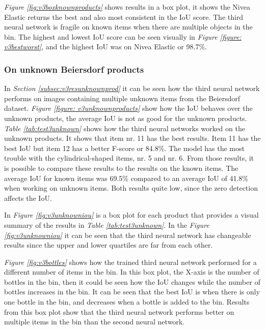 \textit{Figure \ref{fig:v3boxknownproducts}} shows results in a box plot, it shows the Nivea Elastic returns the best and also most consistent in the IoU score. The third neural network is fragile on known items when there are multiple objects in the bin. The highest and lowest IoU score can be seen visually in \textit{Figure \ref{figure: v3bestworst}}, and the highest IoU was on Nivea Elastic or 98.7\%. 

\subsubsection{On unknown Beiersdorf products}
In \textit{Section \ref{subsec:v3resunknownprod}} it can be seen how the third neural network performs on images containing multiple unknown items from the Beiersdorf dataset. \textit{Figure \ref{figure: v3unknownproducts}} show how the IoU behaves over the unknown products, the average IoU is not as good for the unknown products. 
\textit{Table \ref{tab:test3unknown}} shows how the third neural networks worked on the unknown products. It shows that item nr. 11 has the best results. Item 11 has the best IoU but item 12 has a better F-score or 84.8\%. The model has the most trouble with the cylindrical-shaped items, nr. 5 and nr. 6. From those results, it is possible to compare these results to the results on the known items. The average IoU for known items was 69.5\% compared to an average IoU of 41.8\% when working on unknown items. Both results quite low, since the zero detection affects the IoU.



In \textit{Figure \ref{fig:v3unknowniou}} is a box plot for each product that provides a visual summary of the results in \textit{Table \ref{tab:test3unknown}}. In the \textit{Figure \ref{fig:v3unknowniou}} it can be seen that the third neural network has changeable results since the upper and lower quartiles are far from each other.



\textit{Figure \ref{fig:v3bottles}} shows how the trained third neural network performed for a different number of items in the bin. In this box plot, the X-axis is the number of bottles in the bin, then it could be seen how the IoU changes while the number of bottles increases in the bin. It can be seen that the best IoU is when there is only one bottle in the bin, and decreases when a bottle is added to the bin. Results from this box plot show that the third neural network performs better on multiple items in the bin than the second neural network.

